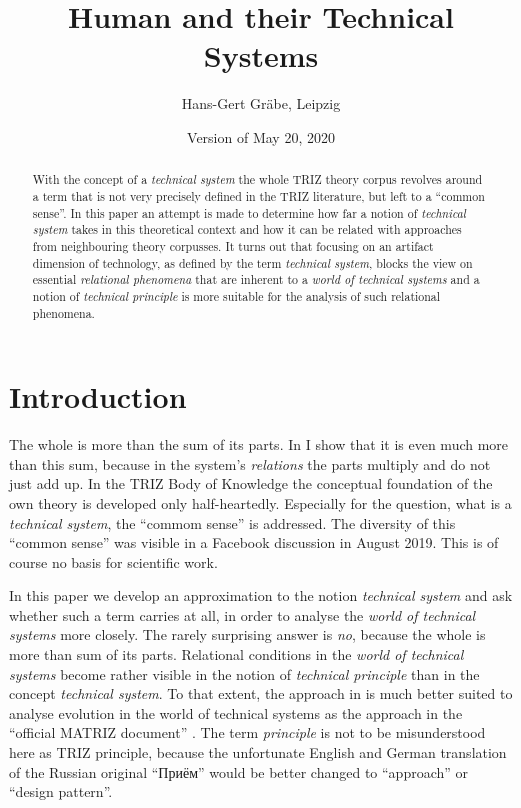 \documentclass[11pt,a4paper]{article}
\title{Human and their Technical Systems}
\author{Hans-Gert Gräbe, Leipzig}
\date{Version of May 20, 2020}
\begin{document}
\maketitle

\begin{abstract}
  With the concept of a \emph{technical system} the whole TRIZ theory corpus
  revolves around a term that is not very precisely defined in the TRIZ
  literature, but left to a ``common sense''.  In this paper an attempt is
  made to determine how far a notion of \emph{technical system} takes in this
  theoretical context and how it can be related with approaches from
  neighbouring theory corpusses.  It turns out that focusing on an artifact
  dimension of technology, as defined by the term \emph{technical system},
  blocks the view on essential \emph{relational phenomena} that are inherent
  to a \emph{world of technical systems} and a notion of \emph{technical
    principle} is more suitable for the analysis of such relational phenomena.
\end{abstract}

\section{Introduction}

The whole is more than the sum of its parts. In \cite{Graebe2020a} I show that
it is even much more than this sum, because in the system's \emph{relations}
the parts multiply and do not just add up.  In the TRIZ Body of Knowledge
\cite{TBK-2007} the conceptual foundation of the own theory is developed only
half-heartedly. Especially for the question, what is a \emph{technical
  system}, the ``commom sense'' is addressed. The diversity of this ``common
sense'' was visible in a Facebook discussion \cite{Graebe2019} in August
2019.  This is of course no basis for scientific work.

In this paper we develop an approximation to the notion \emph{technical
  system} and ask whether such a term carries at all, in order to analyse the
\emph{world of technical systems} more closely.  The rarely surprising answer
is \emph{no}, because the whole is more than sum of its parts.  Relational
conditions in the \emph{world of technical systems} become rather visible in
the notion of \emph{technical principle} than in the concept \emph{technical
  system}. To that extent, the approach in \cite{Shpakovsky2010} is much
better suited to analyse evolution in the world of technical systems as the
approach in the ``official MATRIZ document'' \cite{TESE2018}.  The term
\emph{principle} is not to be misunderstood here as TRIZ principle, because
the unfortunate English and German translation of the Russian original
\foreignlanguage{russian}{``Приём''} would be better changed to ``approach''
or ``design pattern''.
\end{document}
